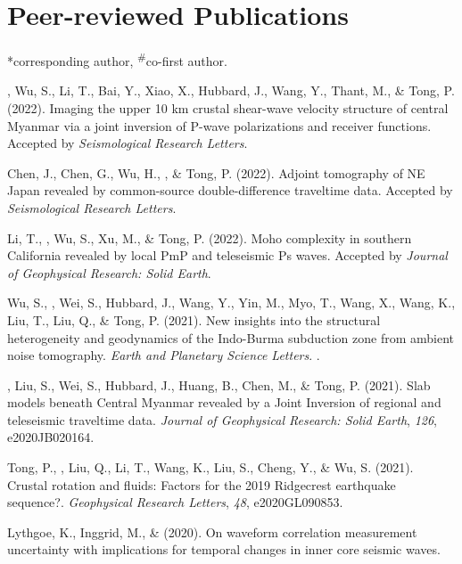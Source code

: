 \section{Peer-reviewed Publications}
\newcommand{\CS}{*} %
\newcommand{\CF}{\textsuperscript{\#}} %

\CS corresponding author, \CF co-first author.
\begin{etaremune}
\item
    \Yao, Wu, S., Li, T., Bai, Y., Xiao, X., Hubbard, J., Wang, Y., Thant, M., \& Tong, P. (2022).
    Imaging the upper 10 km crustal shear-wave velocity structure of central Myanmar via a joint inversion of P-wave polarizations and receiver functions.
    Accepted by \textit{Seismological Research Letters}.
\item
    Chen, J., Chen, G., Wu, H., \Yao, \& Tong, P. (2022).
    Adjoint tomography of NE Japan revealed by common-source double-difference traveltime data.
    Accepted by \textit{Seismological Research Letters}.
\item
    Li, T., \Yao, Wu, S., Xu, M., \& Tong, P. (2022).
    Moho complexity in southern California revealed by local PmP and teleseismic Ps waves.
    Accepted by \textit{Journal of Geophysical Research: Solid Earth}.
\item
    Wu, S., \Yao, Wei, S., Hubbard, J., Wang, Y., Yin, M., Myo, T., Wang, X., Wang, K., Liu, T., Liu, Q., \& Tong, P. (2021).
    New insights into the structural heterogeneity and geodynamics of the Indo-Burma subduction zone from ambient noise tomography.
    \textit{Earth and Planetary Science Letters}.
    .
\item
    \Yao, Liu, S., Wei, S., Hubbard, J., Huang, B., Chen, M., \& Tong, P. (2021).
    Slab models beneath Central Myanmar revealed by a Joint Inversion of regional and teleseismic traveltime data.
    \textit{Journal of Geophysical Research: Solid Earth}, \textit{126}, e2020JB020164.
\item
    Tong, P., \Yao, Liu, Q., Li, T., Wang, K., Liu, S., Cheng, Y., \& Wu, S. (2021).
    Crustal rotation and fluids: Factors for the 2019 Ridgecrest earthquake sequence?.
    \textit{Geophysical Research Letters}, \textit{48}, e2020GL090853.
\item
    Lythgoe, K., Inggrid, M., \& \Yao (2020).
    On waveform correlation measurement uncertainty with implications for temporal changes in inner core seismic waves.

\end{etaremune}
